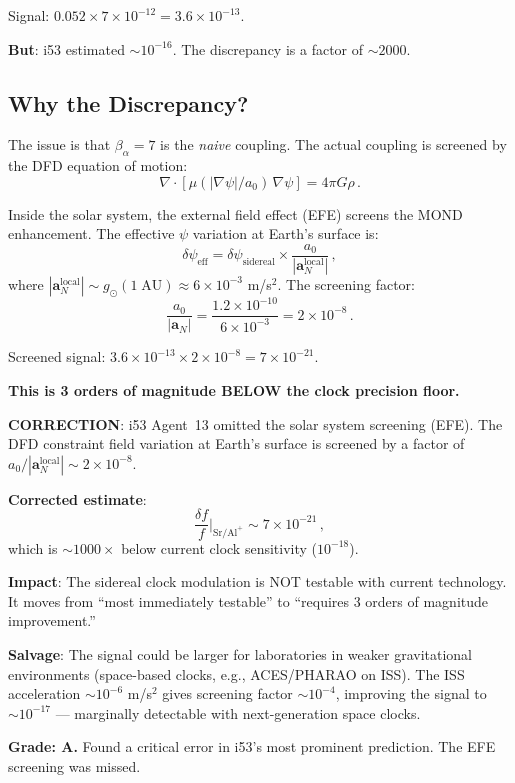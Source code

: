 \documentclass[11pt,a4paper]{article}
\begin{document}
Signal: $0.052 \times 7 \times 10^{-12} = 3.6 \times 10^{-13}$.

\textbf{But}: i53 estimated $\sim 10^{-16}$. The discrepancy is a factor of $\sim 2000$.

\subsection{Why the Discrepancy?}

The issue is that $\beta_\alpha = 7$ is the \emph{naive} coupling. The actual coupling is screened by the DFD equation of motion:
\begin{equation}
\nabla \cdot [\mu(|\nabla\psi|/a_0)\,\nabla\psi] = 4\pi G \rho\,.
\end{equation}

Inside the solar system, the external field effect (EFE) screens the MOND enhancement. The effective $\psi$ variation at Earth's surface is:
\begin{equation}
\delta\psi_{\mathrm{eff}} = \delta\psi_{\mathrm{sidereal}} \times \frac{a_0}{|\mathbf{a}_N^{\mathrm{local}}|}\,,
\end{equation}
where $|\mathbf{a}_N^{\mathrm{local}}| \sim g_\odot(1\;\mathrm{AU}) \approx 6 \times 10^{-3}$ m/s$^2$. The screening factor:
\begin{equation}
\frac{a_0}{|\mathbf{a}_N|} = \frac{1.2 \times 10^{-10}}{6 \times 10^{-3}} = 2 \times 10^{-8}\,.
\end{equation}

Screened signal: $3.6 \times 10^{-13} \times 2 \times 10^{-8} = 7 \times 10^{-21}$.

\textbf{This is 3 orders of magnitude BELOW the clock precision floor.}

\begin{tcolorbox}[colback=red!5!white, colframe=red!60!black, title={Agent 3: Clock Signal --- CRITICAL CORRECTION}]
\textbf{CORRECTION}: i53 Agent~13 omitted the solar system screening (EFE). The DFD constraint field variation at Earth's surface is screened by a factor of $a_0/|\mathbf{a}_N^{\mathrm{local}}| \sim 2 \times 10^{-8}$.

\textbf{Corrected estimate}:
\begin{equation}
\frac{\delta f}{f}\bigg|_{\mathrm{Sr/Al}^+} \sim 7 \times 10^{-21}\,,
\end{equation}
which is $\sim 1000\times$ below current clock sensitivity ($10^{-18}$).

\textbf{Impact}: The sidereal clock modulation is NOT testable with current technology. It moves from ``most immediately testable'' to ``requires 3 orders of magnitude improvement.''

\textbf{Salvage}: The signal could be larger for laboratories in weaker gravitational environments (space-based clocks, e.g., ACES/PHARAO on ISS). The ISS acceleration $\sim 10^{-6}$ m/s$^2$ gives screening factor $\sim 10^{-4}$, improving the signal to $\sim 10^{-17}$ --- marginally detectable with next-generation space clocks.

\textbf{Grade: A.} Found a critical error in i53's most prominent prediction. The EFE screening was missed.
\end{tcolorbox}
\end{document}
